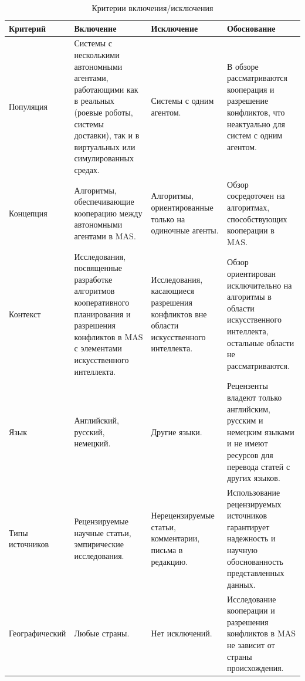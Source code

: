 \documentclass[%
]{ittmm}
\begin{document}
\begin{table}
  \centering
  \caption{Критерии включения/исключения}
  \label{tab:criteria}
  \begin{tabularx}{\textwidth}{|X|X|X|X|}
    \hline
    Критерий & Включение & Исключение & Обоснование\\
    \hline
    \hline
 Популяция        & Системы с несколькими автономными агентами, работающими как в реальных (роевые роботы, системы доставки), так и в виртуальных или симулированных средах. & Системы с одним агентом.                                                              & В обзоре рассматриваются кооперация и разрешение конфликтов, что неактуально для систем с одним агентом.                  \\
    \hline
 Концепция        & Алгоритмы, обеспечивающие кооперацию между автономными агентами в MAS.                                                                                   & Алгоритмы, ориентированные только на одиночные агенты.                                & Обзор сосредоточен на алгоритмах, способствующих кооперации в MAS.                                                        \\
    \hline
 Контекст         & Исследования, посвященные разработке алгоритмов кооперативного планирования и разрешения конфликтов в MAS с элементами искусственного интеллекта.        & Исследования, касающиеся разрешения конфликтов вне области искусственного интеллекта. & Обзор ориентирован исключительно на алгоритмы в области искусственного интеллекта, остальные области не рассматриваются.  \\
    \hline
 Язык             & Английский, русский, немецкий.                                                                                                                           & Другие языки.                                                                         & Рецензенты владеют только английским, русским и немецким языками и не имеют ресурсов для перевода статей с других языков. \\
    \hline
 Типы источников  & Рецензируемые научные статьи, эмпирические исследования.                                                                                                 & Нерецензируемые статьи, комментарии, письма в редакцию.                               & Использование рецензируемых источников гарантирует надежность и научную обоснованность представленных данных.             \\
    \hline
 Географический   & Любые страны.                                                                                                                                            & Нет исключений.                                                                       & Исследование кооперации и разрешения конфликтов в MAS не зависит от страны происхождения.                                 \\

\end{tabularx}
\end{table}
\end{document}
